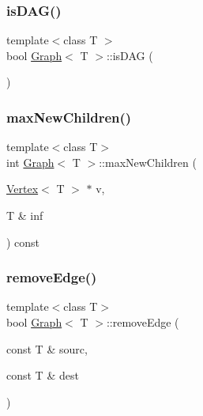 \subsubsection{\texorpdfstring{is\+D\+A\+G()}{isDAG()}}
{\footnotesize\ttfamily template$<$class T $>$ \\
bool \hyperlink{class_graph}{Graph}$<$ T $>$\+::is\+D\+AG (\begin{DoxyParamCaption}{ }\end{DoxyParamCaption})}

\mbox{\label{class_graph_a675559f8cddfe43bc416023ad9f28cfa}} 
\subsubsection{\texorpdfstring{max\+New\+Children()}{maxNewChildren()}}
{\footnotesize\ttfamily template$<$class T$>$ \\
int \hyperlink{class_graph}{Graph}$<$ T $>$\+::max\+New\+Children (\begin{DoxyParamCaption}\item[{\hyperlink{class_vertex}{Vertex}$<$ T $>$ $\ast$}]{v,  }\item[{T \&}]{inf }\end{DoxyParamCaption}) const}

\mbox{\label{class_graph_a1106092a37366486cf55576f9ec01692}} 
\subsubsection{\texorpdfstring{remove\+Edge()}{removeEdge()}}
{\footnotesize\ttfamily template$<$class T$>$ \\
bool \hyperlink{class_graph}{Graph}$<$ T $>$\+::remove\+Edge (\begin{DoxyParamCaption}\item[{const T \&}]{sourc,  }\item[{const T \&}]{dest }\end{DoxyParamCaption})}

\mbox{\label{class_graph_af9c903104ad69a7782979fa9caedf163}} 

